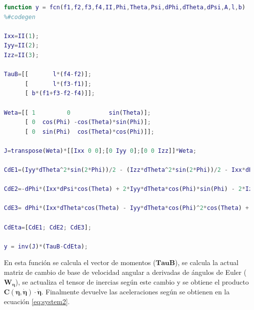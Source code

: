 \documentclass[twoside,11pt]{book}
\begin{document}
\singlespacing
\begin{lstlisting}[language=Matlab]
function y = fcn(f1,f2,f3,f4,II,Phi,Theta,Psi,dPhi,dTheta,dPsi,A,l,b)
%#codegen

Ixx=II(1);
Iyy=II(2);
Izz=II(3);
 
TauB=[[       l*(f4-f2)];
      [       l*(f3-f1)];
      [ b*(f1+f3-f2-f4)]];  

Weta=[[ 1         0           sin(Theta)];
      [ 0  cos(Phi) -cos(Theta)*sin(Phi)];
      [ 0  sin(Phi)  cos(Theta)*cos(Phi)]];
 
J=transpose(Weta)*[[Ixx 0 0];[0 Iyy 0];[0 0 Izz]]*Weta;  

CdE1=(Iyy*dTheta^2*sin(2*Phi))/2 - (Izz*dTheta^2*sin(2*Phi))/2 - Ixx*dPsi*dTheta*cos(Theta) - (Iyy*dPsi^2*sin(2*Phi)*cos(Theta)^2)/2 + (Izz*dPsi^2*sin(2*Phi)*cos(Theta)^2)/2 - Iyy*dPsi*dTheta*cos(2*Phi)*cos(Theta) + Izz*dPsi*dTheta*cos(2*Phi)*cos(Theta);

CdE2=-dPhi*(Ixx*dPsi*cos(Theta) + 2*Iyy*dTheta*cos(Phi)*sin(Phi) - 2*Izz*dTheta*cos(Phi)*sin(Phi) + Iyy*dPsi*cos(Phi)^2*cos(Theta) - Izz*dPsi*cos(Phi)^2*cos(Theta) - Iyy*dPsi*cos(Theta)*sin(Phi)^2 + Izz*dPsi*cos(Theta)*sin(Phi)^2)  - Ixx*dPsi^2*cos(Theta)*sin(Theta) + Iyy*dPsi^2*cos(Theta)*sin(Phi)^2*sin(Theta) + Izz*dPsi^2*cos(Phi)^2*cos(Theta)*sin(Theta);

CdE3= dPhi*(Ixx*dTheta*cos(Theta) - Iyy*dTheta*cos(Phi)^2*cos(Theta) + Izz*dTheta*cos(Phi)^2*cos(Theta) + Iyy*dTheta*cos(Theta)*sin(Phi)^2 - Izz*dTheta*cos(Theta)*sin(Phi)^2 + 2*Iyy*dPsi*cos(Phi)*cos(Theta)^2*sin(Phi) - 2*Izz*dPsi*cos(Phi)*cos(Theta)^2*sin(Phi)) + Iyy*dTheta^2*cos(Phi)*sin(Phi)*sin(Theta) - Izz*dTheta^2*cos(Phi)*sin(Phi)*sin(Theta) + 2*Ixx*dPsi*dTheta*cos(Theta)*sin(Theta) - 2*Izz*dPsi*dTheta*cos(Phi)^2*cos(Theta)*sin(Theta) - 2*Iyy*dPsi*dTheta*cos(Theta)*sin(Phi)^2*sin(Theta);

CdEta=[CdE1; CdE2; CdE3];

y = inv(J)*(TauB-CdEta);
\end{lstlisting}
\onehalfspacing

En esta función se calcula el vector de momentos ($\mathbf{TauB}$), se calcula la actual matriz de cambio de base de velocidad angular a derivadas de ángulos de Euler ($\mathbf{W_\eta}$), se actualiza el tensor de inercias según este cambio y se obtiene el producto $\pmb{C(\eta,\dot{\eta})}\cdot\pmb{\dot{\eta}}$. Finalmente devuelve las aceleraciones según se obtienen en la ecuación \ref{eq:system2}.
\end{document}
